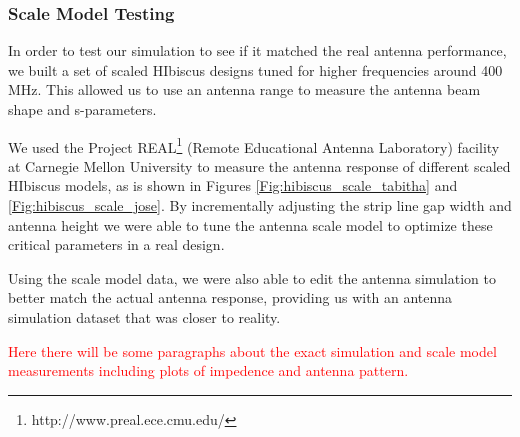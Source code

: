 \subsubsection{Scale Model Testing}
In order to test our simulation to see if it matched the real antenna performance, we built a set of scaled HIbiscus designs tuned for higher frequencies around 400 MHz. This allowed us to use an antenna range to measure the antenna beam shape and s-parameters. 

We used the Project REAL\footnote{http://www.preal.ece.cmu.edu/} (Remote Educational Antenna Laboratory) facility at Carnegie Mellon University to measure the antenna response of different scaled HIbiscus models, as is shown in Figures \ref{Fig:hibiscus_scale_tabitha} and \ref{Fig:hibiscus_scale_jose}. By incrementally adjusting the strip line gap width and antenna height we were able to tune the antenna scale model to optimize these critical parameters in a real design. 

Using the scale model data, we were also able to edit the antenna simulation to better match the actual antenna response, providing us with an antenna simulation dataset that was closer to reality. 

\textcolor{red}{Here there will be some paragraphs about the exact simulation and scale model measurements including plots of impedence and antenna pattern.}

